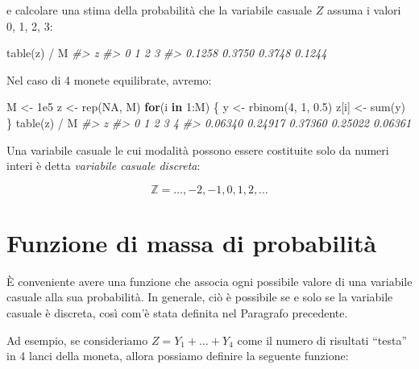 \documentclass[
  11pt,
]{krantz}
\makeatletter
\newenvironment{Shaded}{\begin{snugshade}}{\end{snugshade}}
\newcommand{\CommentTok}[1]{\textcolor[rgb]{0.37,0.37,0.37}{\textit{#1}}}
\newcommand{\ConstantTok}[1]{\textcolor[rgb]{0,0,0}{#1}}
\newcommand{\ControlFlowTok}[1]{\textcolor[rgb]{0.27,0.27,0.27}{\textbf{#1}}}
\newcommand{\DecValTok}[1]{\textcolor[rgb]{0.06,0.06,0.06}{#1}}
\newcommand{\FloatTok}[1]{\textcolor[rgb]{0.06,0.06,0.06}{#1}}
\newcommand{\FunctionTok}[1]{\textcolor[rgb]{0,0,0}{#1}}
\newcommand{\NormalTok}[1]{#1}
\newcommand{\OtherTok}[1]{\textcolor[rgb]{0.37,0.37,0.37}{#1}}
\newcommand{\SpecialCharTok}[1]{\textcolor[rgb]{0,0,0}{#1}}
\newenvironment{kframe}{%
\medskip{}
\setlength{\fboxsep}{.8em}
 \def\at@end@of@kframe{}%
 \ifinner\ifhmode%
  \def\at@end@of@kframe{\end{minipage}}%
  \begin{minipage}{\columnwidth}%
 \fi\fi%
 \def\FrameCommand##1{\hskip\@totalleftmargin \hskip-\fboxsep
 \colorbox{shadecolor}{##1}\hskip-\fboxsep
     \hskip-\linewidth \hskip-\@totalleftmargin \hskip\columnwidth}%
 \MakeFramed {\advance\hsize-\width
   \@totalleftmargin\z@ \linewidth\hsize
   \@setminipage}}%
 {\par\unskip\endMakeFramed%
 \at@end@of@kframe}
\renewenvironment{Shaded}{\begin{kframe}}{\end{kframe}}
\theoremstyle{definition}
\theoremstyle{definition}
\theoremstyle{definition}
\theoremstyle{definition}
\theoremstyle{remark}
\makeatother
\begin{document}
e calcolare una stima della probabilità che la variabile casuale \(Z\) assuma i valori 0, 1, 2, 3:

\begin{Shaded}
\begin{Highlighting}[]
\FunctionTok{table}\NormalTok{(z) }\SpecialCharTok{/}\NormalTok{ M}
\CommentTok{\#\textgreater{} z}
\CommentTok{\#\textgreater{}      0      1      2      3 }
\CommentTok{\#\textgreater{} 0.1258 0.3750 0.3748 0.1244}
\end{Highlighting}
\end{Shaded}

Nel caso di 4 monete equilibrate, avremo:

\begin{Shaded}
\begin{Highlighting}[]
\NormalTok{M }\OtherTok{\textless{}{-}} \FloatTok{1e5}
\NormalTok{z }\OtherTok{\textless{}{-}} \FunctionTok{rep}\NormalTok{(}\ConstantTok{NA}\NormalTok{, M)}
\ControlFlowTok{for}\NormalTok{(i }\ControlFlowTok{in} \DecValTok{1}\SpecialCharTok{:}\NormalTok{M) \{}
\NormalTok{  y }\OtherTok{\textless{}{-}} \FunctionTok{rbinom}\NormalTok{(}\DecValTok{4}\NormalTok{, }\DecValTok{1}\NormalTok{, }\FloatTok{0.5}\NormalTok{)}
\NormalTok{  z[i] }\OtherTok{\textless{}{-}} \FunctionTok{sum}\NormalTok{(y)}
\NormalTok{\}}
\FunctionTok{table}\NormalTok{(z) }\SpecialCharTok{/}\NormalTok{ M}
\CommentTok{\#\textgreater{} z}
\CommentTok{\#\textgreater{}       0       1       2       3       4 }
\CommentTok{\#\textgreater{} 0.06340 0.24917 0.37360 0.25022 0.06361}
\end{Highlighting}
\end{Shaded}

Una variabile casuale le cui modalità possono essere costituite solo da numeri interi è detta \emph{variabile casuale discreta}:

\[
\mathbb{Z} = \dots, -2, -1, 0, 1, 2, \dots
\]

\hypertarget{sec:fun-mass-prob}{%
\section{Funzione di massa di probabilità}\label{sec:fun-mass-prob}}

È conveniente avere una funzione che associa ogni possibile valore di una variabile casuale alla sua probabilità. In generale, ciò è possibile se e solo se la variabile casuale è discreta, così com'è stata definita nel Paragrafo precedente.

Ad esempio, se consideriamo \(Z = Y_1 + \dots + Y_4\) come il numero di risultati ``testa'' in 4 lanci della moneta, allora possiamo definire la seguente funzione:
\end{document}
